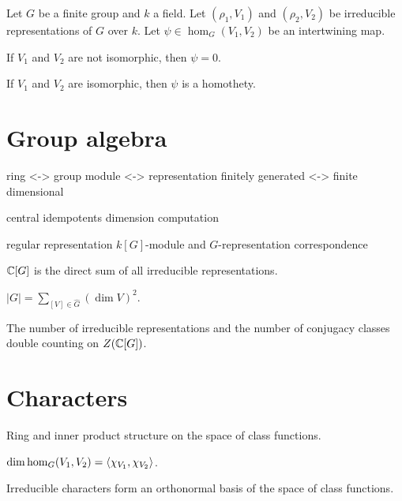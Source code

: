 \documentclass{../note}
\begin{document}
\begin{prb}
Let $G$ be a finite group and $k$ a field.
Let $(\rho_1,V_1)$ and $(\rho_2,V_2)$ be irreducible representations of $G$ over $k$.
Let $\psi\in\hom_G(V_1,V_2)$ be an intertwining map.
\begin{parts}
\item If $V_1$ and $V_2$ are not isomorphic, then $\psi=0$.
\item If $V_1$ and $V_2$ are isomorphic, then $\psi$ is a homothety.
\end{parts}
\end{prb}




\section{Group algebra}


\begin{prb}
ring <-> group
module <-> representation
finitely generated <-> finite dimensional
\end{prb}

\begin{prb}
central idempotents
dimension computation
\end{prb}

\begin{prb}
regular representation
$k[G]$-module and $G$-representation correspondence
\begin{parts}
\item $\mathbb{C}[G]$ is the direct sum of all irreducible representations.
\item $|G|=\sum_{[V]\in\hat G}(\dim V)^2$.
\end{parts}
\end{prb}

\begin{prb}
The number of irreducible representations and the number of conjugacy classes
double counting on $Z(\mathbb{C}[G])$.
\end{prb}



\section{Characters}




\begin{prb}
Ring and inner product structure on the space of class functions.
\begin{parts}
\item $\dim\hom_G(V_1,V_2)=\langle\chi_{V_1},\chi_{V_2}\rangle$.
\item Irreducible characters form an orthonormal basis of the space of class functions.
\end{parts}
\end{prb}
\end{document}
